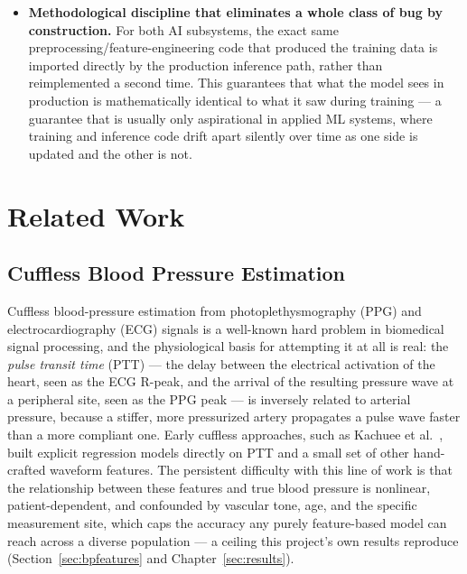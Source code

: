 \documentclass[12pt,a4paper]{report}
\begin{document}
\begin{itemize}[leftmargin=1.4em]
  fit once enough reference readings accumulate, with a separate scheduled job
  that watches for the fit drifting out of date against the patient's own
  history. This is evaluated here against its own honestly inconclusive
  simulation result (Section~\ref{sec:calibration}) rather than assumed to
  work simply because the mechanism is well-designed.
  \item \textbf{Methodological discipline that eliminates a whole class of bug
  by construction.} For both AI subsystems, the exact same
  preprocessing/feature-engineering code that produced the training data is
  imported directly by the production inference path, rather than
  reimplemented a second time. This guarantees that what the model sees in
  production is mathematically identical to what it saw during training --- a
  guarantee that is usually only aspirational in applied ML systems, where
  training and inference code drift apart silently over time as one side is
  updated and the other is not.
\end{itemize}


\chapter{Related Work}

\section{Cuffless Blood Pressure Estimation}

Cuffless blood-pressure estimation from photoplethysmography (PPG) and
electrocardiography (ECG) signals is a well-known hard problem in biomedical
signal processing, and the physiological basis for attempting it at all is
real: the \emph{pulse transit time} (PTT) --- the delay between the electrical
activation of the heart, seen as the ECG R-peak, and the arrival of the
resulting pressure wave at a peripheral site, seen as the PPG peak --- is
inversely related to arterial pressure, because a stiffer, more pressurized
artery propagates a pulse wave faster than a more compliant one. Early
cuffless approaches, such as Kachuee et al.~\cite{kachuee2015}, built explicit
regression models directly on PTT and a small set of other hand-crafted
waveform features. The persistent difficulty with this line of work is that
the relationship between these features and true blood pressure is nonlinear,
patient-dependent, and confounded by vascular tone, age, and the specific
measurement site, which caps the accuracy any purely feature-based model can
reach across a diverse population --- a ceiling this project's own results
reproduce (Section~\ref{sec:bpfeatures} and Chapter~\ref{sec:results}).
\end{document}
